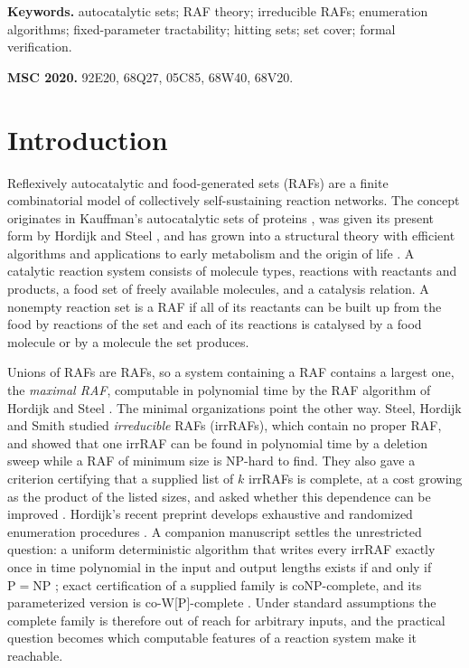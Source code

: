 \documentclass[11pt,a4paper]{article}
\theoremstyle{plain}
\theoremstyle{definition}
\theoremstyle{remark}
\begin{document}
\noindent\textbf{Keywords.} autocatalytic sets; RAF theory; irreducible RAFs; enumeration algorithms; fixed-parameter tractability; hitting sets; set cover; formal verification.

\medskip
\noindent\textbf{MSC 2020.} 92E20, 68Q27, 05C85, 68W40, 68V20.

\section{Introduction}\label{sec:intro}

Reflexively autocatalytic and food-generated sets (RAFs) are a finite combinatorial model of collectively self-sustaining reaction networks. The concept originates in Kauffman's autocatalytic sets of proteins \cite{kauffman1986autocatalytic}, was given its present form by Hordijk and Steel \cite{hordijk2004detecting}, and has grown into a structural theory with efficient algorithms and applications to early metabolism and the origin of life \cite{hordijk2012structure,hordijk2015algorithms,steel2019autocatalytic,sousa2015ecoli,xavier2020autocatalytic}. A catalytic reaction system consists of molecule types, reactions with reactants and products, a food set of freely available molecules, and a catalysis relation. A nonempty reaction set is a RAF if all of its reactants can be built up from the food by reactions of the set and each of its reactions is catalysed by a food molecule or by a molecule the set produces.

Unions of RAFs are RAFs, so a system containing a RAF contains a largest one, the \emph{maximal RAF}, computable in polynomial time by the RAF algorithm of Hordijk and Steel \cite{hordijk2004detecting}. The minimal organizations point the other way. Steel, Hordijk and Smith \cite{steel2013minimal} studied \emph{irreducible} RAFs (irrRAFs), which contain no proper RAF, and showed that one irrRAF can be found in polynomial time by a deletion sweep while a RAF of minimum size is NP-hard to find. They also gave a criterion certifying that a supplied list of $k$ irrRAFs is complete, at a cost growing as the product of the listed sizes, and asked whether this dependence can be improved \cite[Section~6.1]{steel2013minimal}. Hordijk's recent preprint develops exhaustive and randomized enumeration procedures \cite{hordijk2026enumerating}. A companion manuscript settles the unrestricted question: a uniform deterministic algorithm that writes every irrRAF exactly once in time polynomial in the input and output lengths exists if and only if $\mathrm P=\mathrm{NP}$ \cite{classification2026}; exact certification of a supplied family is coNP-complete, and its parameterized version is co-W[P]-complete \cite{certification2026}. Under standard assumptions the complete family is therefore out of reach for arbitrary inputs, and the practical question becomes which computable features of a reaction system make it reachable.
\end{document}
